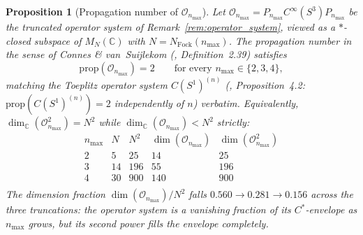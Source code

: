 \documentclass[11pt]{article}
\newtheorem{proposition}{Proposition}
\begin{document}
\begin{proposition}[Propagation number of $\mathcal{O}_{n_{\max}}$]
\label{prop:propagation_number}
Let $\mathcal{O}_{n_{\max}} = P_{n_{\max}} C^\infty(S^3) P_{n_{\max}}$
be the truncated operator system of
Remark~\ref{rem:operator_system}, viewed as a $*$-closed subspace of
$M_N(\mathbb{C})$ with $N = N_{\mathrm{Fock}}(n_{\max})$.  The
propagation number in the sense of Connes \& van~Suijlekom
(\cite{connes_vs2021}, Definition~2.39) satisfies
\begin{equation}
   \mathrm{prop}(\mathcal{O}_{n_{\max}}) = 2
   \qquad \text{for every } n_{\max} \in \{2, 3, 4\},
   \label{eq:prop_two}
\end{equation}
matching the Toeplitz operator system $C(S^1)^{(n)}$
(\cite{connes_vs2021}, Proposition~4.2: $\mathrm{prop}(C(S^1)^{(n)}) =
2$ independently of $n$) verbatim.  Equivalently,
$\dim_{\mathbb{C}}(\mathcal{O}_{n_{\max}}^2) = N^2$ while
$\dim_{\mathbb{C}}(\mathcal{O}_{n_{\max}}) < N^2$ strictly:
\[
\renewcommand{\arraystretch}{1.15}
\begin{array}{c|c|c|c|c}
n_{\max} & N & N^2 & \dim(\mathcal{O}_{n_{\max}}) &
   \dim(\mathcal{O}_{n_{\max}}^2) \\ \hline
2 & 5  & 25  & 14  & 25  \\
3 & 14 & 196 & 55  & 196 \\
4 & 30 & 900 & 140 & 900 \\
\end{array}
\]
The dimension fraction $\dim(\mathcal{O}_{n_{\max}}) / N^2$ falls
$0.560 \to 0.281 \to 0.156$ across the three truncations: the
operator system is a vanishing fraction of its $C^*$-envelope as
$n_{\max}$ grows, but its second power fills the envelope
completely.
\end{proposition}
\end{document}
